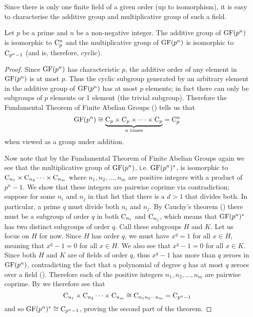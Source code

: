 Since there is only one finite field of a given order (up to isomorphism), it is easy to characterise the additive group and multiplicative group of such a field.

\begin{theorem}\label{thrm-structure-of-finite-field}
    Let $p$ be a prime and $n$ be a non-negative integer. The additive group of $\mathrm{GF}(p^n)$ is isomorphic to $\mathrm{C}_{p}^n$ and the multiplicative group of $\mathrm{GF}(p^n)$ is isomorphic to $\mathrm{C}_{p^n-1}$ (and is, therefore, cyclic).
\end{theorem}
\begin{proof}
    Since $\mathrm{GF}(p^n)$ has characteristic $p$, the additive order of any element in $\mathrm{GF}(p^n)$ is at most $p$. Thus the cyclic subgroup generated by an arbitrary element in the additive group of $\mathrm{GF}(p^n)$ has at most $p$ elements; in fact there can only be subgroups of $p$ elements or 1 element (the trivial subgroup). Therefore the Fundamental Theorem of Finite Abelian Groups () tells us that
    \[
        \mathrm{GF}(p^n) \cong \underbrace{\mathrm{C}_{p} \times \mathrm{C}_{p} \times \cdots \times \mathrm{C}_{p}}_{n\text{ times}} = \mathrm{C}_{p}^n
    \]
    when viewed as a group under addition.

    Now note that by the Fundamental Theorem of Finite Abelian Groups again we see that the multiplicative group of $\mathrm{GF}(p^n)$, i.e. $\mathrm{GF}(p^n)^\ast$, is isomorphic to $\mathrm{C}_{n_1}\times\mathrm{C}_{n_2}\cdots\times\mathrm{C}_{n_m}$ where $n_1, n_2, \dots, n_m$ are positive integers with a product of $p^n - 1$. We show that these integers are pairwise coprime via contradiction; suppose for some $n_i$ and $n_j$ in that list that there is a $d > 1$ that divides both. In particular, a prime $q$ must divide both $n_i$ and $n_j$. By Cauchy's theorem () there must be a subgroup of order $q$ in both $\mathrm{C}_{n_i}$ and $\mathrm{C}_{n_j}$, which means that $\mathrm{GF}(p^n)^\ast$ has two distinct subgroups of order $q$. Call these subgroups $H$ and $K$. Let us focus on $H$ for now. Since $H$ has order $q$, we must have $x^q = 1$ for all $x \in H$, meaning that $x^q - 1 = 0$ for all $x \in H$. We also see that $x^q - 1 = 0$ for all $x \in K$. Since both $H$ and $K$ are of fields of order $q$, thus $x^q - 1$ has more than $q$ zeroes in $\mathrm{GF}(p^n)$, contradicting the fact that a polynomial of degree $q$ has at most $q$ zeroes over a field (). Therefore each of the positive integers $n_1, n_2, \dots, n_m$ are pairwise coprime. By  we therefore see that
    \[
        \mathrm{C}_{n_1}\times\mathrm{C}_{n_2}\cdots\times\mathrm{C}_{n_m} \cong \mathrm{C}_{n_1n_2\cdots n_m} = \mathrm{C}_{p^n-1}
    \]
    and so $\mathrm{GF}(p^n)^\ast \cong \mathrm{C}_{p^n-1}$, proving the second part of the theorem.
\end{proof}

